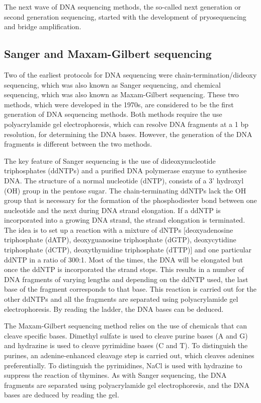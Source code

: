 The next wave of DNA sequencing methods, the so-called next generation or second generation sequencing, started with the development of pryosequencing and bridge amplification.

\subsection{Sanger and Maxam-Gilbert sequencing}

Two of the earliest protocols for DNA sequencing were chain-termination/dideoxy sequencing\cite{pmid271968}, which was also known as Sanger sequencing, and chemical sequencing\cite{pmid265521}, which was also known as Maxam-Gilbert sequencing. These two methods, which were developed in the 1970s, are considered to be the first generation of DNA sequencing methods. Both methods require the use polyacrylamide gel electrophoresis, which can resolve DNA fragments at a 1 bp resolution, for determining the DNA bases. However, the generation of the DNA fragments is different between the two methods.

The key feature of Sanger sequencing is the use of dideoxynucleotide triphosphates (ddNTPs) and a purified DNA polymerase enzyme to synthesise DNA. The structure of a normal nucleotide (dNTP), consists of a 3' hydroxyl (OH) group in the pentose sugar. The chain-terminating ddNTPs lack the OH group that is necessary for the formation of the phosphodiester bond between one nucleotide and the next during DNA strand elongation. If a ddNTP is incorporated into a growing DNA strand, the strand elongation is terminated. The idea is to set up a reaction with a mixture of dNTPs [deoxyadenosine triphosphate (dATP), deoxyguanosine triphosphate (dGTP), deoxycytidine triphosphate (dCTP), deoxythymidine triphosphate (dTTP)] and one particular ddNTP in a ratio of 300:1. Most of the times, the DNA will be elongated but once the ddNTP is incorporated the strand stops. This results in a number of DNA fragments of varying lengths and depending on the ddNTP used, the last base of the fragment corresponds to that base. This reaction is carried out for the other ddNTPs and all the fragments are separated using polyacrylamide gel electrophoresis. By reading the ladder, the DNA bases can be deduced.

The Maxam-Gilbert sequencing method relies on the use of chemicals that can cleave specific bases. Dimethyl sulfate is used to cleave purine bases (A and G) and hydrazine is used to cleave pyrimidine bases (C and T). To distinguish the purines, an adenine-enhanced cleavage step is carried out, which cleaves adenines preferentially. To distinguish the pyrimidines, NaCl is used with hydrazine to suppress the reaction of thymines. As with Sanger sequencing, the DNA fragments are separated using polyacrylamide gel electrophoresis, and the DNA bases are deduced by reading the gel.

